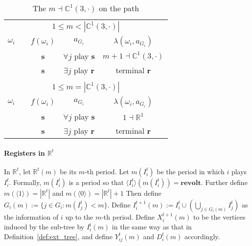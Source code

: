 \documentclass[12pt,letter]{article}
\newcommand{\Kappa}{\mathbb{C}}
\newcommand{\Omicron}{\mathbb{R}}
\theoremstyle{definition}
\theoremstyle{definition}
\theoremstyle{remark}
\theoremstyle{claim}
\begin{document}
\begin{table}[!htbp]
\caption{The $m\dashv\Kappa^1(3,\cdot)$ on the path}
\label{table:eqm_path_k03}
\begin{center}
\begin{tabular}{c c | c | c | c}
\multicolumn{5}{c}{$1\leq m < |\Kappa^1(3,\cdot)|$}\\
$\omega_i$ 	 & 	   &	$f(\omega_i)$  &	$a_{G_i}$ & $\lambda(\omega_i,a_{G_i})$ \\
\hline
\hline
  	&	& \textbf{s} & $\forall j$ play $\textbf{s}$ 	& $m+1\dashv \Kappa^1(3,\cdot)$\\
  	&  & \textbf{s}  &  $\exists j$ play $\textbf{r}$  	& terminal \textbf{r}\\
\hline
\\
\multicolumn{5}{c}{$1\leq m = |\Kappa^1(3,\cdot)|$}\\
$\omega_i$ 	 & 	   &	$f(\omega_i)$  &	$a_{G_i}$ & $\lambda(\omega_i,a_{G_i})$ \\
\hline
\hline
  	& 	& \textbf{s} & $\forall j$ play $\textbf{s}$ 	& $1\dashv \Omicron^1$\\
  	&  & \textbf{s}  &  $\exists j$ play $\textbf{r}$  	& terminal \textbf{r}\\
\hline
\end{tabular}
\end{center}
\end{table}



\clearpage

\paragraph{Registers in $\Omicron^t$}
In $\Omicron^t$, let $\Omicron^t(m)$ be its $m$-th period. Let $m(I^{t}_i)$ be the period in which $i$ plays $I^t_i$. Formally, $m(I^t_i)$ is a period so that $\langle I^{t}_i \rangle(m(I^t_i))=\textbf{revolt}$. Further define $m(\langle 1 \rangle)=|\Omicron^t|$ and $m(\langle 0 \rangle)=|\Omicron^t|+1$ Then define $G_i(m):=\{j\in G_i: m(I^t_j)<m\}$. Define $I^{t+1}_i(m):= I^t_i\cup(\bigcup_{j\in G_i(m)}I^t_j)$ as the information of $i$ up to the $m$-th period. Define $X^{t+1}_i(m)$ to be the vertices induced by the sub-tree by $I^t_i(m)$ in the same way as that in Definition~\ref{def:ext_tree}, and define $Y^t_{ij}(m)$ and $D^t_i(m)$ accordingly.



\end{document}
